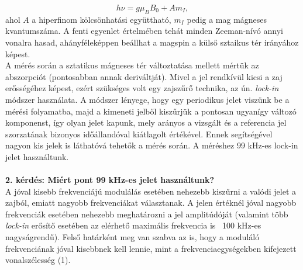 \documentclass[12pt,a4paper]{article}
\begin{document}
\begin{equation}
h\nu=g\mu_{B}B_0+Am_{I},
\end{equation}
ahol $A$ a hiperfinom kölcsönhatási együttható, $m_{I}$ pedig a mag mágneses kvantumszáma. A fenti egyenlet értelmében tehát minden Zeeman-nívó annyi vonalra hasad, ahányféleképpen beállhat a magspin a külső sztaikus tér irányához képest.\\
\hspace*{10pt} A mérés során a sztatikus mágneses tér változtatása mellett mértük az abszorpciót (pontosabban annak deriváltját). Mivel a jel rendkívül kicsi a zaj erősségéhez képest, ezért szükséges volt egy zajszűrő technika, az ún. \emph{lock-in} módszer használata. A módszer lényege, hogy egy periodikus jelet viszünk be a mérési folyamatba, majd a kimeneti jelből kiszűrjük a pontosan ugyanígy változó komponenst, így olyan jelet kapunk, mely arányos a vizsgált és a referencia jel szorzatának bizonyos időállandóval kiátlagolt értékével. Ennek segítségével nagyon kis jelek is láthatóvá tehetők a mérés során. A méréshez 99 kHz-es lock-in jelet használtunk.\\
\\
\textbf{2. kérdés: Miért pont 99 kHz-es jelet használtunk?}\\
A jóval kisebb frekvenciájú modulálás esetében nehezebb kiszűrni a valódi jelet a zajból, emiatt nagyobb frekvenciákat választanak. A jelen értéknél jóval nagyobb frekvenciák esetében nehezebb meghatározni a jel amplitúdóját (valamint több \emph{lock-in} erősítő esetében az elérhető maximális frekvencia is ~100 kHz-es nagyságrendű). Felső határként meg van szabva az is, hogy a moduláló frekvenciának jóval kisebbnek kell lennie, mint a frekvenciaegységekben kifejezett vonalszélesség (1).
\end{document}
